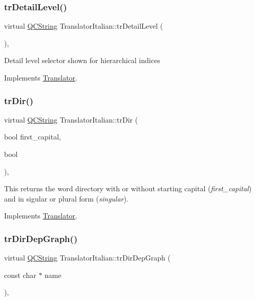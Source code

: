 \subsubsection{\texorpdfstring{trDetailLevel()}{trDetailLevel()}}
{\footnotesize\ttfamily virtual \mbox{\hyperlink{class_q_c_string}{Q\+C\+String}} Translator\+Italian\+::tr\+Detail\+Level (\begin{DoxyParamCaption}{ }\end{DoxyParamCaption})\hspace{0.3cm}{\ttfamily [inline]}, {\ttfamily [virtual]}}

Detail level selector shown for hierarchical indices 

Implements \mbox{\hyperlink{class_translator}{Translator}}.

\mbox{\label{class_translator_italian_a419b502c4fc1c36dcda3fc0bd1bd6a33}} 
\subsubsection{\texorpdfstring{trDir()}{trDir()}}
{\footnotesize\ttfamily virtual \mbox{\hyperlink{class_q_c_string}{Q\+C\+String}} Translator\+Italian\+::tr\+Dir (\begin{DoxyParamCaption}\item[{bool}]{first\+\_\+capital,  }\item[{bool}]{ }\end{DoxyParamCaption})\hspace{0.3cm}{\ttfamily [inline]}, {\ttfamily [virtual]}}

This returns the word directory with or without starting capital ({\itshape first\+\_\+capital}) and in sigular or plural form ({\itshape singular}). 

Implements \mbox{\hyperlink{class_translator}{Translator}}.

\mbox{\label{class_translator_italian_aec757bee06a313f82e17748fa0c72cb2}} 
\subsubsection{\texorpdfstring{trDirDepGraph()}{trDirDepGraph()}}
{\footnotesize\ttfamily virtual \mbox{\hyperlink{class_q_c_string}{Q\+C\+String}} Translator\+Italian\+::tr\+Dir\+Dep\+Graph (\begin{DoxyParamCaption}\item[{const char $\ast$}]{name }\end{DoxyParamCaption})\hspace{0.3cm}{\ttfamily [inline]}, {\ttfamily [virtual]}}

